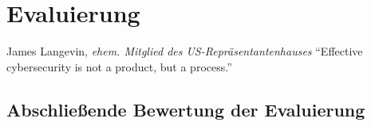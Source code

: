 \section{Evaluierung}\label{sec:Evaluation}

\begin{chapquote}{James Langevin, \textit{ehem. Mitglied des US-Repräsentantenhauses}}
``Effective cybersecurity is not a product, but a process.''
\end{chapquote}

\lipsum[1-4]

\subsection{Abschließende Bewertung der Evaluierung}
\lipsum[1-2]
\newpage